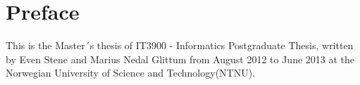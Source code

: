 \chapter*{Preface}
This is the Master´s thesis of IT3900 - Informatics Postgraduate Thesis, written by Even Stene and Marius Nedal Glittum from August 2012 to June 2013 at the Norwegian University of Science and Technology(NTNU).